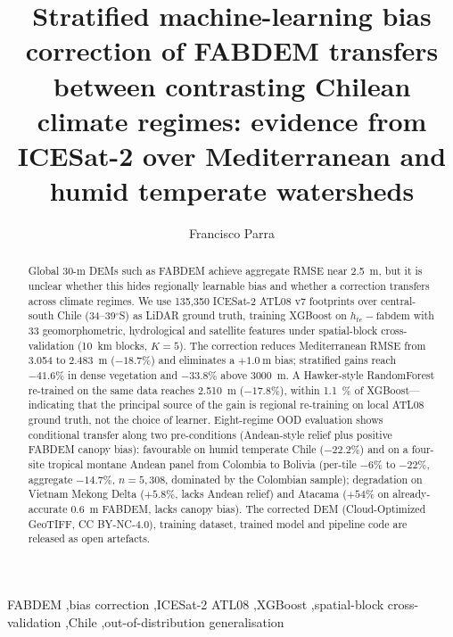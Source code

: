 \documentclass[preprint,authoryear,number]{elsarticle}
\begin{document}
\begin{frontmatter}

\title{Stratified machine-learning bias correction of FABDEM transfers between contrasting Chilean climate regimes: evidence from ICESat-2 over Mediterranean and humid temperate watersheds}

\author[usach]{Francisco Parra}

\address[usach]{Universidad de Santiago de Chile (USACH), Santiago, Chile}

\begin{abstract}
Global 30-m DEMs such as FABDEM achieve aggregate RMSE near \SI{2.5}{\meter}, but it is unclear whether this hides regionally learnable bias and whether a correction transfers across climate regimes. We use 135{,}350 ICESat-2 ATL08 v7 footprints over central-south Chile (34--39$^{\circ}$S) as LiDAR ground truth, training XGBoost on $h_{te} - \mathrm{fabdem}$ with 33 geomorphometric, hydrological and satellite features under spatial-block cross-validation (\SI{10}{\kilo\meter} blocks, $K=5$). The correction reduces Mediterranean RMSE from 3.054 to \SI{2.483}{\meter} ($-18.7\%$) and eliminates a $+\SI{1.0}{\meter}$ bias; stratified gains reach $-41.6\%$ in dense vegetation and $-33.8\%$ above \SI{3000}{\meter}. A Hawker-style RandomForest re-trained on the same data reaches \SI{2.510}{\meter} ($-17.8\%$), within \SI{1.1}{\percent} of XGBoost---indicating that the principal source of the gain is regional re-training on local ATL08 ground truth, not the choice of learner. Eight-regime OOD evaluation shows conditional transfer along two pre-conditions (Andean-style relief plus positive FABDEM canopy bias): favourable on humid temperate Chile ($-22.2\%$) and on a four-site tropical montane Andean panel from Colombia to Bolivia (per-tile $-6\%$ to $-22\%$, aggregate $-14.7\%$, $n{=}5{,}308$, dominated by the Colombian sample); degradation on Vietnam Mekong Delta ($+5.8\%$, lacks Andean relief) and Atacama ($+54\%$ on already-accurate \SI{0.6}{\meter} FABDEM, lacks canopy bias). The corrected DEM (Cloud-Optimized GeoTIFF, CC BY-NC-4.0), training dataset, trained model and pipeline code are released as open artefacts.
\end{abstract}

\begin{keyword}
FABDEM \sep bias correction \sep ICESat-2 ATL08 \sep XGBoost \sep spatial-block cross-validation \sep Chile \sep out-of-distribution generalisation
\end{keyword}

\end{frontmatter}
\end{document}
